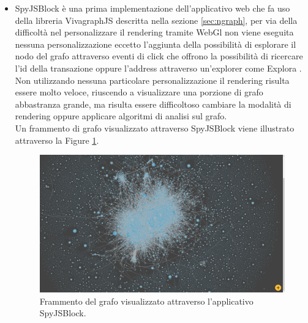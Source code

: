 \begin{itemize}
  \item SpyJSBlock è una prima implementazione dell'applicativo web che fa uso della libreria VivagraphJS descritta nella sezione \ref{sec:ngraph}, per via della difficoltà nel personalizzare il rendering tramite WebGl non viene eseguita nessuna personalizzazione eccetto l'aggiunta della possibilità di esplorare il nodo del grafo attraverso eventi di click che offrono la possibilità di ricercare l'id della transazione oppure l'address attraverso un'explorer come Explora \cite{blockstream:esplora}.\\
  Non utilizzando nessuna particolare personalizzazione il rendering risulta essere molto veloce, riuscendo a visualizzare una porzione di grafo abbastranza grande, ma risulta essere difficoltoso cambiare la modalità di rendering oppure applicare algoritmi di analisi sul grafo.\\
  Un frammento di grafo visualizzato attraverso SpyJSBlock viene illustrato attraverso la Figure \ref{fig:vivagraphSpyJSBlock}.

  \begin{figure}
  \centering
   \includegraphics[scale=0.2]{images/demo/vivagraph.png}
   \caption{Frammento del grafo visualizzato attraverso l'applicativo SpyJSBlock.}\label{fig:vivagraphSpyJSBlock}
  \end{figure}


\end{itemize}
